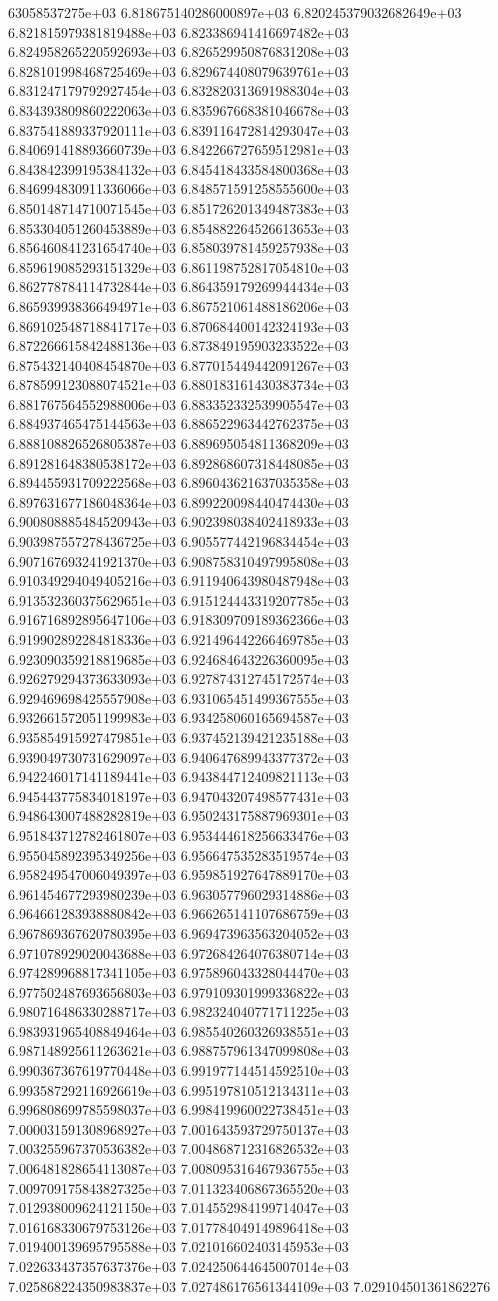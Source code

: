 63058537275e+03	6.818675140286000897e+03	6.820245379032682649e+03	6.821815979381819488e+03	6.823386941416697482e+03	6.824958265220592693e+03	6.826529950876831208e+03	6.828101998468725469e+03	6.829674408079639761e+03	6.831247179792927454e+03	6.832820313691988304e+03	6.834393809860222063e+03	6.835967668381046678e+03	6.837541889337920111e+03	6.839116472814293047e+03	6.840691418893660739e+03	6.842266727659512981e+03	6.843842399195384132e+03	6.845418433584800368e+03	6.846994830911336066e+03	6.848571591258555600e+03	6.850148714710071545e+03	6.851726201349487383e+03	6.853304051260453889e+03	6.854882264526613653e+03	6.856460841231654740e+03	6.858039781459257938e+03	6.859619085293151329e+03	6.861198752817054810e+03	6.862778784114732844e+03	6.864359179269944434e+03	6.865939938366494971e+03	6.867521061488186206e+03	6.869102548718841717e+03	6.870684400142324193e+03	6.872266615842488136e+03	6.873849195903233522e+03	6.875432140408454870e+03	6.877015449442091267e+03	6.878599123088074521e+03	6.880183161430383734e+03	6.881767564552988006e+03	6.883352332539905547e+03	6.884937465475144563e+03	6.886522963442762375e+03	6.888108826526805387e+03	6.889695054811368209e+03	6.891281648380538172e+03	6.892868607318448085e+03	6.894455931709222568e+03	6.896043621637035358e+03	6.897631677186048364e+03	6.899220098440474430e+03	6.900808885484520943e+03	6.902398038402418933e+03	6.903987557278436725e+03	6.905577442196834454e+03	6.907167693241921370e+03	6.908758310497995808e+03	6.910349294049405216e+03	6.911940643980487948e+03	6.913532360375629651e+03	6.915124443319207785e+03	6.916716892895647106e+03	6.918309709189362366e+03	6.919902892284818336e+03	6.921496442266469785e+03	6.923090359218819685e+03	6.924684643226360095e+03	6.926279294373633093e+03	6.927874312745172574e+03	6.929469698425557908e+03	6.931065451499367555e+03	6.932661572051199983e+03	6.934258060165694587e+03	6.935854915927479851e+03	6.937452139421235188e+03	6.939049730731629097e+03	6.940647689943377372e+03	6.942246017141189441e+03	6.943844712409821113e+03	6.945443775834018197e+03	6.947043207498577431e+03	6.948643007488282819e+03	6.950243175887969301e+03	6.951843712782461807e+03	6.953444618256633476e+03	6.955045892395349256e+03	6.956647535283519574e+03	6.958249547006049397e+03	6.959851927647889170e+03	6.961454677293980239e+03	6.963057796029314886e+03	6.964661283938880842e+03	6.966265141107686759e+03	6.967869367620780395e+03	6.969473963563204052e+03	6.971078929020043688e+03	6.972684264076380714e+03	6.974289968817341105e+03	6.975896043328044470e+03	6.977502487693656803e+03	6.979109301999336822e+03	6.980716486330288717e+03	6.982324040771711225e+03	6.983931965408849464e+03	6.985540260326938551e+03	6.987148925611263621e+03	6.988757961347099808e+03	6.990367367619770448e+03	6.991977144514592510e+03	6.993587292116926619e+03	6.995197810512134311e+03	6.996808699785598037e+03	6.998419960022738451e+03	7.000031591308968927e+03	7.001643593729750137e+03	7.003255967370536382e+03	7.004868712316826532e+03	7.006481828654113087e+03	7.008095316467936755e+03	7.009709175843827325e+03	7.011323406867365520e+03	7.012938009624121150e+03	7.014552984199714047e+03	7.016168330679753126e+03	7.017784049149896418e+03	7.019400139695795588e+03	7.021016602403145953e+03	7.022633437357637376e+03	7.024250644645007014e+03	7.025868224350983837e+03	7.027486176561344109e+03	7.029104501361862276